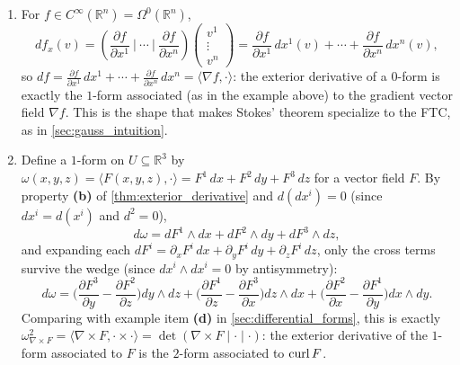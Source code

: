 \begin{example}
\label{ex:exterior_derivative_gradient_curl}
\begin{enumerate}[label=\textbf{(\alph*)}]
  \item For $f \in C^\infty(\mathbb{R}^n) = \Omega^0(\mathbb{R}^n)$,
  \[df_x(v) = \left(\frac{\partial f}{\partial x^1}\ \Big|\ \cdots\ \Big|\ \frac{\partial f}
    {\partial x^n}\right)\!\begin{pmatrix}v^1\\ \vdots \\ v^n\end{pmatrix}
    = \frac{\partial f}{\partial x^1}\,dx^1(v) + \cdots + \frac{\partial f}{\partial x^n}\,
    dx^n(v),\]
  so $df = \frac{\partial f}{\partial x^1}\,dx^1 + \cdots + \frac{\partial f}{\partial x^n}\,
  dx^n = \langle \nabla f,\cdot\rangle$: the exterior derivative of a $0$-form is exactly the
  $1$-form associated (as in the example above) to the gradient vector field $\nabla f$. This
  is the shape that makes Stokes' theorem specialize to the FTC, as in
  \cref{sec:gauss_intuition}.
  \item Define a $1$-form on $U \subseteq \mathbb{R}^3$ by $\omega(x,y,z) = \langle
  F(x,y,z),\cdot\rangle = F^1\,dx+F^2\,dy+F^3\,dz$ for a vector field $F$. By property
  \textbf{(b)} of
  \cref{thm:exterior_derivative} and $d(dx^i)=0$ (since $dx^i = d(x^i)$ and $d^2=0$),
  \[
  d\omega = dF^1\wedge dx + dF^2\wedge dy + dF^3\wedge dz,
  \]
  and expanding each $dF^i = \partial_x F^i\,dx+\partial_y F^i\,dy+\partial_z F^i\,dz$, only
  the cross terms survive the wedge (since $dx^i\wedge dx^i=0$ by antisymmetry):
  \[
  d\omega = \Big(\frac{\partial F^3}{\partial y}-\frac{\partial F^2}{\partial z}\Big)dy\wedge
    dz + \Big(\frac{\partial F^1}{\partial z}-\frac{\partial F^3}{\partial x}\Big)dz\wedge dx
    + \Big(\frac{\partial F^2}{\partial x}-\frac{\partial F^1}{\partial y}\Big)dx\wedge dy.
  \]
  Comparing with example item \textbf{(d)} in \cref{sec:differential_forms}, this is exactly
  $\omega_{\nabla\times F}^2 = \langle\nabla\times F,\cdot\times\cdot\rangle = \det(\nabla
  \times F\mid\cdot\mid\cdot)$: the exterior derivative of the $1$-form associated to $F$ is
  the $2$-form associated to $\operatorname{curl} F$.


\end{enumerate}
\end{example}
